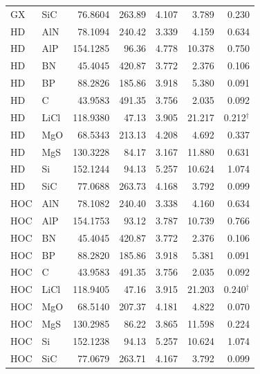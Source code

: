 {\begin{longtable}{llrrrrr}
GX & SiC & 76.8604 & 263.89 & 4.107 & 3.789 & 0.230 \\
HD & AlN & 78.1094 & 240.42 & 3.339 & 4.159 & 0.634 \\
HD & AlP & 154.1285 & 96.36 & 4.778 & 10.378 & 0.750 \\
HD & BN & 45.4045 & 420.87 & 3.772 & 2.376 & 0.106 \\
HD & BP & 88.2826 & 185.86 & 3.918 & 5.380 & 0.091 \\
HD & C & 43.9583 & 491.35 & 3.756 & 2.035 & 0.092 \\
HD & LiCl & 118.9380 & 47.13 & 3.905 & 21.217 & 0.212$^\dagger$ \\
HD & MgO & 68.5343 & 213.13 & 4.208 & 4.692 & 0.337 \\
HD & MgS & 130.3228 & 84.17 & 3.167 & 11.880 & 0.631 \\
HD & Si & 152.1244 & 94.13 & 5.257 & 10.624 & 1.074 \\
HD & SiC & 77.0688 & 263.73 & 4.168 & 3.792 & 0.099 \\
HOC & AlN & 78.1082 & 240.40 & 3.338 & 4.160 & 0.634 \\
HOC & AlP & 154.1753 & 93.12 & 3.787 & 10.739 & 0.766 \\
HOC & BN & 45.4045 & 420.87 & 3.772 & 2.376 & 0.106 \\
HOC & BP & 88.2820 & 185.86 & 3.918 & 5.381 & 0.091 \\
HOC & C & 43.9583 & 491.35 & 3.756 & 2.035 & 0.092 \\
HOC & LiCl & 118.9405 & 47.16 & 3.915 & 21.203 & 0.240$^\dagger$ \\
HOC & MgO & 68.5140 & 207.37 & 4.181 & 4.822 & 0.070 \\
HOC & MgS & 130.2985 & 86.22 & 3.865 & 11.598 & 0.224 \\
HOC & Si & 152.1238 & 94.13 & 5.257 & 10.624 & 1.074 \\
HOC & SiC & 77.0679 & 263.71 & 4.167 & 3.792 & 0.099 \\
\bottomrule
\end{longtable}
}

